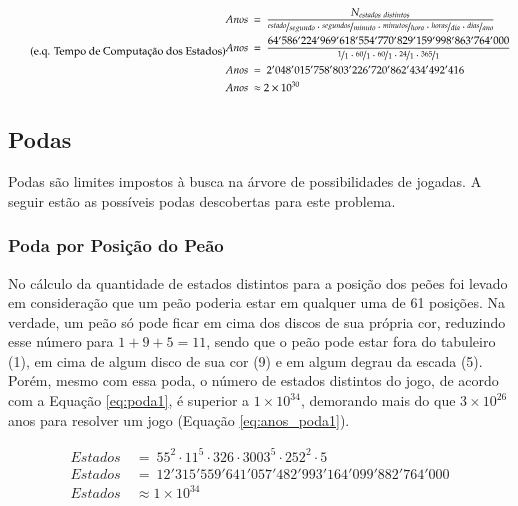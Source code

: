 \begin{equation} \label{eq:anos_estados} \tag{e.q. Tempo de Computação dos Estados}
\begin{split}
Anos\ &=\ \dfrac{N_{estados\ distintos}}{\nicefrac{estado}{segundo}\cdot\nicefrac{segundos}{minuto}\cdot\nicefrac{minutos}{hora}\cdot\nicefrac{horas}{dia}\cdot\nicefrac{dias}{ano}}\\
Anos\ &=\ \dfrac{64'586'224'969'618'554'770'829'159'998'863'764'000}{\nicefrac{1}{1}\cdot\nicefrac{60}{1}\cdot\nicefrac{60}{1}\cdot\nicefrac{24}{1}\cdot\nicefrac{365}{1}}\\
Anos\ &=\ 2'048'015'758'803'226'720'862'434'492'416\\
Anos\ &\approx 2\times10^{30}
\end{split}
\end{equation}

\subsection{Podas}

Podas são limites impostos à busca na árvore de possibilidades de jogadas. A seguir estão as possíveis podas descobertas para este problema.

\subsubsection{Poda por Posição do Peão}

No cálculo da quantidade de estados distintos para a posição dos peões foi levado em consideração que um peão poderia estar em qualquer uma de 61 posições. Na verdade, um peão só pode ficar em cima dos discos de sua própria cor, reduzindo esse número para $1+9+5=11$, sendo que o peão pode estar fora do tabuleiro (1), em cima de algum disco de sua cor (9) e em algum degrau da escada (5). Porém, mesmo com essa poda, o número de estados distintos do jogo, de acordo com a Equação \ref{eq:poda1}, é superior a $1\times 10^{34}$, demorando mais do que $3\times10^{26}$ anos para resolver um jogo (Equação \ref{eq:anos_poda1}).

\begin{equation} \label{eq:poda1} \tag{e.q. Poda por posição}
\begin{split}
	Estados\ &=\ 55^{2}\cdot11^{5}\cdot326\cdot3003^{5}\cdot252^{2}\cdot5\\
	Estados\ &=\ 12'315'559'641'057'482'993'164'099'882'764'000\\
	Estados\ &\approx 1\times 10^{34}
\end{split}
\end{equation}


